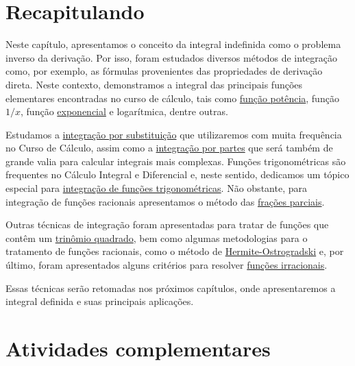 \cleardoublepage\documentclass[../main.tex]{subfiles}
\begin{document}
\section{Recapitulando}
Neste capítulo, apresentamos o conceito da integral indefinida como o problema inverso da derivação. Por isso, foram estudados diversos métodos de integração como, por exemplo, as fórmulas provenientes das propriedades de derivação direta. Neste contexto, demonstramos a integral das principais funções elementares encontradas no curso de cálculo, tais como \hyperlink{IntFuncPot}{função potência}, função \hyperlink{IntFunc1/x}{$1/x$}, função \hyperlink{IntExp}{exponencial} e logarítmica, dentre outras.

Estudamos a \hyperlink{IntSubst}{integração por substituição} que utilizaremos com muita frequência no Curso de Cálculo, assim como a \hyperlink{IntPartes}{integração por partes} que será também de grande valia para calcular integrais mais complexas. Funções trigonométricas são frequentes no Cálculo Integral e Diferencial e, neste sentido, dedicamos um tópico especial para \hyperlink{IntTrig}{integração de funções trigonométricas}. Não obstante, para integração de funções racionais apresentamos o método das \hyperlink{FracParc}{frações parciais}.

Outras técnicas de integração foram apresentadas para tratar de  funções que contêm um \hyperlink{TrinQuad}{trinômio quadrado},  bem como algumas metodologias para o tratamento de funções racionais, como o método de \hyperlink{Herm}{Hermite-Ostrogradski} e, por último, foram apresentados alguns critérios para resolver \hyperlink{FuncIrr}{funções irracionais}.

Essas técnicas serão retomadas nos próximos capítulos, onde apresentaremos a integral definida e suas principais aplicações.

\section{Atividades complementares}
\end{document}
